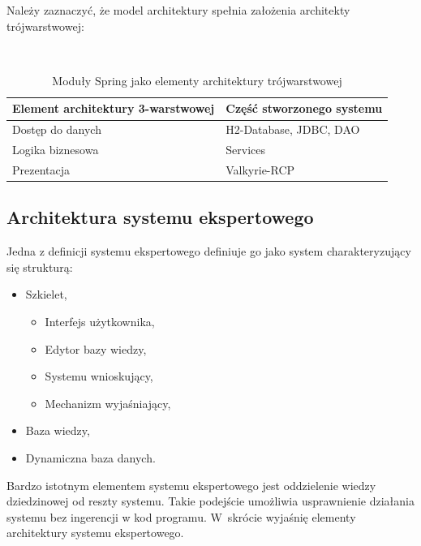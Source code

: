 Należy zaznaczyć, że model architektury spełnia założenia architekty trójwarstwowej:
\begin{table}[h]
 \caption{Moduły Spring jako elementy architektury trójwarstwowej}
 \small\tt
 \centering
 \vspace{0in}
 \begin{tabular}{|l|l|}
 \hline
 \textbf{Element architektury 3-warstwowej} & \textbf{Część stworzonego systemu} \\ 
 \hline
 Dostęp do danych & H2-Database, JDBC, DAO \\
 \hline
 Logika biznesowa & Services \\
 \hline
 Prezentacja & Valkyrie-RCP \\
 \hline
 \end{tabular}
\end{table}

\subsection{Architektura systemu ekspertowego}
\label{sec:architekturaSystemuEkspertowego}
Jedna z definicji systemu ekspertowego definiuje go jako system charakteryzujący się strukturą:
\begin{itemize}
 \item 	Szkielet,
       \begin{itemize}
	 \item Interfejs użytkownika,
	 \item Edytor bazy wiedzy,
	 \item Systemu wnioskujący,
	 \item Mechanizm wyjaśniający,
       \end{itemize}
 \item Baza wiedzy,
 \item Dynamiczna baza danych.
\end{itemize}

Bardzo istotnym elementem systemu ekspertowego jest oddzielenie wiedzy dziedzinowej od reszty systemu. Takie podejście umożliwia usprawnienie działania systemu bez ingerencji w kod programu. W~skrócie wyjaśnię elementy architektury systemu ekspertowego.

